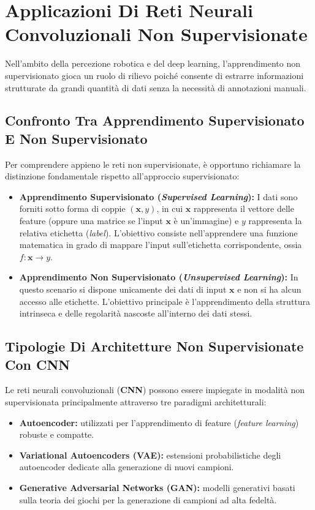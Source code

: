 ﻿\documentclass[11pt, a4paper]{article}
\author{Francesco Lo Verde}
\begin{document}
\section{Applicazioni Di Reti Neurali Convoluzionali Non Supervisionate}

Nell'ambito della percezione robotica e del deep learning, l'apprendimento non supervisionato gioca un ruolo di rilievo poiché consente di estrarre informazioni strutturate da grandi quantità di dati senza la necessità di annotazioni manuali.

\subsection{Confronto Tra Apprendimento Supervisionato E Non Supervisionato}

Per comprendere appieno le reti non supervisionate, è opportuno richiamare la distinzione fondamentale rispetto all'approccio supervisionato:
\begin{itemize}
    \item \textbf{Apprendimento Supervisionato (\emph{Supervised Learning}):} I dati sono forniti sotto forma di coppie $(\bm{x}, y)$, in cui $\bm{x}$ rappresenta il vettore delle feature (oppure una matrice se l'input $\bm{x}$ è un'immagine) e $y$ rappresenta la relativa etichetta (\emph{label}). L'obiettivo consiste nell'apprendere una funzione matematica in grado di mappare l'input sull'etichetta corrispondente, ossia $f: \bm{x} \to y$.
    \item \textbf{Apprendimento Non Supervisionato (\emph{Unsupervised Learning}):} In questo scenario si dispone unicamente dei dati di input $\bm{x}$ e non si ha alcun accesso alle etichette. L'obiettivo principale è l'apprendimento della struttura intrinseca e delle regolarità nascoste all'interno dei dati stessi.
\end{itemize}


\subsection{Tipologie Di Architetture Non Supervisionate Con CNN}

Le reti neurali convoluzionali (\textbf{CNN}) possono essere impiegate in modalità non supervisionata principalmente attraverso tre paradigmi architetturali:
\begin{itemize}
    \item \textbf{Autoencoder:} utilizzati per l'apprendimento di feature (\emph{feature learning}) robuste e compatte.
    \item \textbf{Variational Autoencoders (VAE):} estensioni probabilistiche degli autoencoder dedicate alla generazione di nuovi campioni.
    \item \textbf{Generative Adversarial Networks (GAN):} modelli generativi basati sulla teoria dei giochi per la generazione di campioni ad alta fedeltà.
\end{itemize}
\end{document}
